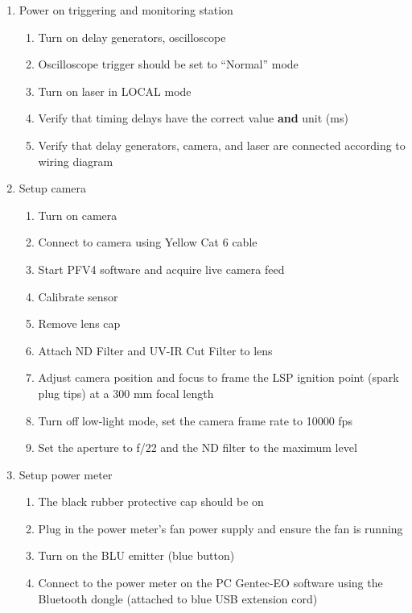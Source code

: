 \begin{enumerate}
\def\labelenumi{\arabic{enumi}.}

\item
  Power on triggering and monitoring station

  \begin{enumerate}
  \def\labelenumii{\arabic{enumii}.}
  
  \item
    Turn on delay generators, oscilloscope
  \item
    Oscilloscope trigger should be set to ``Normal'' mode
  \item
    Turn on laser in LOCAL mode
  \item
    Verify that timing delays have the correct value \textbf{and} unit
    (ms)
  \item
    Verify that delay generators, camera, and laser are connected
    according to wiring diagram
  \end{enumerate}
\item
  Setup camera

  \begin{enumerate}
  \def\labelenumii{\arabic{enumii}.}
  \item
    Turn on camera
  \item
    Connect to camera using Yellow Cat 6 cable
  \item
    Start PFV4 software and acquire live camera feed
  \item
    Calibrate sensor
  \item
    Remove lens cap
  \item
    Attach ND Filter and UV-IR Cut Filter to lens
  \item
    Adjust camera position and focus to frame the LSP ignition point
    (spark plug tips) at a 300 mm focal length

  \item
    Turn off low-light mode, set the camera frame rate to 10000 fps
  \item
    Set the aperture to f/22 and the ND filter to the maximum level
  \end{enumerate}
\item
  Setup power meter

  \begin{enumerate}
  \def\labelenumii{\arabic{enumii}.}
  \item
    The black rubber protective cap should be on
  \item
    Plug in the power meter's fan power supply and ensure the fan is
    running
  \item
    Turn on the BLU emitter (blue button)
  \item
    Connect to the power meter on the PC Gentec-EO software using the
    Bluetooth dongle (attached to blue USB extension cord)


\end{enumerate}
\end{enumerate}
